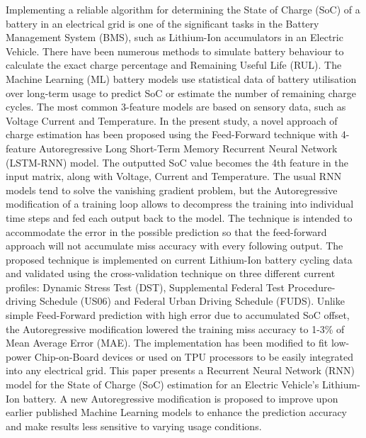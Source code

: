 %
 {
Implementing a reliable algorithm for determining the State of Charge (SoC) of a battery in an electrical grid is one of the significant tasks in the Battery Management System (BMS), such as Lithium-Ion accumulators in an Electric Vehicle.
There have been numerous methods to simulate battery behaviour to calculate the exact charge percentage and Remaining Useful Life (RUL).
The Machine Learning (ML) battery models use statistical data of battery utilisation over long-term usage to predict SoC or estimate the number of remaining charge cycles.
The most common 3-feature models are based on sensory data, such as Voltage Current and Temperature.
In the present study, a novel approach of charge estimation has been proposed using the Feed-Forward technique with 4-feature Autoregressive Long Short-Term Memory Recurrent Neural Network (LSTM-RNN) model.
The outputted SoC value becomes the 4th feature in the input matrix, along with Voltage, Current and Temperature.
The usual RNN models tend to solve the vanishing gradient problem, but the Autoregressive modification of a training loop allows to decompress the training into individual time steps and fed each output back to the model.
The technique is intended to accommodate the error in the possible prediction so that the feed-forward approach will not accumulate miss accuracy with every following output.
The proposed technique is implemented on current Lithium-Ion battery cycling data and validated using the cross-validation technique on three different current profiles: Dynamic Stress Test (DST), Supplemental Federal Test Procedure-driving Schedule (US06) and Federal Urban Driving Schedule (FUDS).
Unlike simple Feed-Forward prediction with high error due to accumulated  SoC offset, the Autoregressive modification lowered the training miss accuracy to 1-3\% of Mean Average Error (MAE).
The implementation has been modified to fit low-power Chip-on-Board devices or used on TPU processors to be easily integrated into any electrical grid.
}{
        This paper presents a Recurrent Neural Network (RNN) model for the State of Charge (SoC) estimation for an Electric Vehicle's Lithium-Ion battery.
        A new Autoregressive modification is proposed to improve upon earlier published Machine Learning models to enhance the prediction accuracy and make results less sensitive to varying usage conditions.
}
